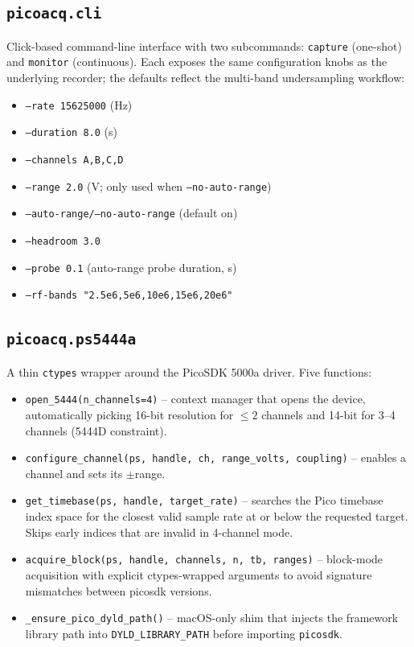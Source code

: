 \documentclass[11pt]{article}
\begin{document}
\subsection{\texttt{picoacq.cli}}

Click-based command-line interface with two subcommands:
\texttt{capture} (one-shot) and \texttt{monitor} (continuous).  Each
exposes the same configuration knobs as the underlying recorder; the
defaults reflect the multi-band undersampling workflow:

\begin{itemize}\itemsep=2pt
\item \texttt{--rate 15625000} (Hz)
\item \texttt{--duration 8.0} (s)
\item \texttt{--channels A,B,C,D}
\item \texttt{--range 2.0} (V; only used when \texttt{--no-auto-range})
\item \texttt{--auto-range/--no-auto-range} (default on)
\item \texttt{--headroom 3.0}
\item \texttt{--probe 0.1} (auto-range probe duration, s)
\item \texttt{--rf-bands "2.5e6,5e6,10e6,15e6,20e6"}
\end{itemize}

\subsection{\texttt{picoacq.ps5444a}}

A thin \texttt{ctypes} wrapper around the PicoSDK 5000a driver.  Five
functions:

\begin{itemize}\itemsep=2pt
\item \texttt{open\_5444(n\_channels=4)} -- context manager that opens
      the device, automatically picking 16-bit resolution for $\le 2$
      channels and 14-bit for 3--4 channels (5444D constraint).
\item \texttt{configure\_channel(ps, handle, ch, range\_volts,
      coupling)} -- enables a channel and sets its $\pm$range.
\item \texttt{get\_timebase(ps, handle, target\_rate)} -- searches the
      Pico timebase index space for the closest valid sample rate at
      or below the requested target.  Skips early indices that are
      invalid in 4-channel mode.
\item \texttt{acquire\_block(ps, handle, channels, n, tb, ranges)} --
      block-mode acquisition with explicit ctypes-wrapped arguments
      to avoid signature mismatches between picosdk versions.
\item \texttt{\_ensure\_pico\_dyld\_path()} -- macOS-only shim that
      injects the framework library path into
      \texttt{DYLD\_LIBRARY\_PATH} before importing \texttt{picosdk}.
\end{itemize}
\end{document}
